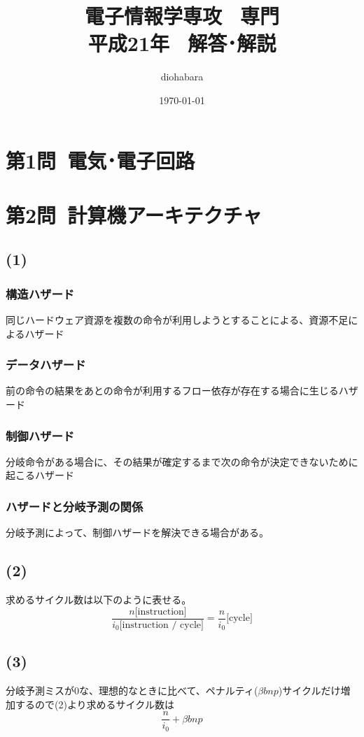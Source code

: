 \documentclass[a4paper,12pt,xelatex,ja=standard]{bxjsarticle}
\title{電子情報学専攻 \, 専門 \\ 平成21年 \, 解答･解説}
\author{diohabara}
\date{\today}
\begin{document}
\maketitle

\section*{第1問\ 電気･電子回路}

\section*{第2問\ 計算機アーキテクチャ}
\subsection*{(1)}
\subsubsection*{構造ハザード}
同じハードウェア資源を複数の命令が利用しようとすることによる、資源不足によるハザード

\subsubsection*{データハザード}
前の命令の結果をあとの命令が利用するフロー依存が存在する場合に生じるハザード

\subsubsection*{制御ハザード}
分岐命令がある場合に、その結果が確定するまで次の命令が決定できないために起こるハザード

\subsubsection*{ハザードと分岐予測の関係}
分岐予測によって、制御ハザードを解決できる場合がある。

\subsection*{(2)}
求めるサイクル数は以下のように表せる。
\[
  \frac{n \text{[instruction]}}{i_0 \text{[instruction / cycle]}} = \frac{n}{i_0}\text{[cycle]}
\]

\subsection*{(3)}
分岐予測ミスが0な、理想的なときに比べて、ペナルティ($\beta bnp$)サイクルだけ増加するので(2)より求めるサイクル数は
\[
  \frac{n}{i_0} + \beta b n p
\]
\end{document}
